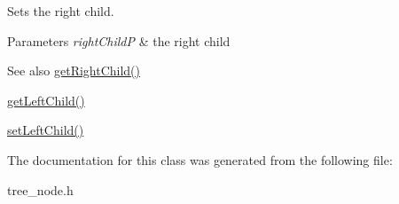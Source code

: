 Sets the right child. 
\begin{DoxyParams}{Parameters}
{\em right\+ChildP} & the right child \\
\hline
\end{DoxyParams}
\begin{DoxySeeAlso}{See also}
\hyperlink{classtree__node_a5e584d47f2c11941fe0406836fe50159}{get\+Right\+Child()} 

\hyperlink{classtree__node_ae161b70a3780e0cb3ecd4b57acc9e2d1}{get\+Left\+Child()} 

\hyperlink{classtree__node_a3db979969a0fe8505ba65c7afabb5463}{set\+Left\+Child()} 
\end{DoxySeeAlso}


The documentation for this class was generated from the following file\+:\begin{DoxyCompactItemize}
\item 
tree\+\_\+node.\+h\end{DoxyCompactItemize}
